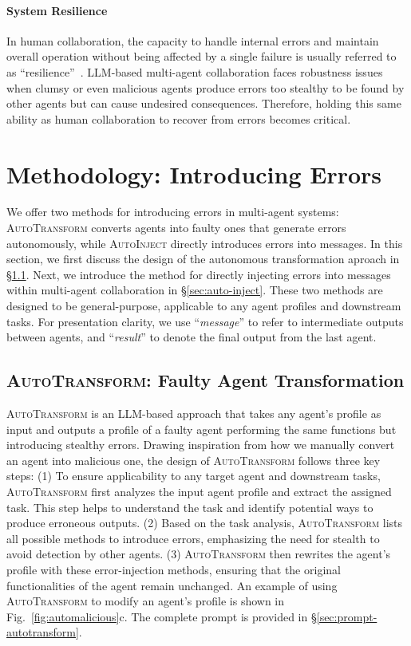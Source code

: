 \documentclass{article}
\theoremstyle{plain}
\theoremstyle{definition}
\theoremstyle{remark}
\begin{document}
\paragraph{System Resilience}
In human collaboration, the capacity to handle internal errors and maintain overall operation without being affected by a single failure is usually referred to as ``resilience''~\cite{alliger2015team, boin2013resilient, hartwig2020workplace}.
LLM-based multi-agent collaboration faces robustness issues when clumsy or even malicious agents produce errors too stealthy to be found by other agents but can cause undesired consequences.
Therefore, holding this same ability as human collaboration to recover from errors becomes critical.
\section{Methodology: Introducing Errors}

We offer two methods for introducing errors in multi-agent systems: \textsc{AutoTransform} converts agents into faulty ones that generate errors autonomously, while \textsc{AutoInject} directly introduces errors into messages.
In this section, we first discuss the design of the autonomous transformation aproach in \S\ref{sec:auto-transform}.
Next, we introduce the method for directly injecting errors into messages within multi-agent collaboration in \S\ref{sec:auto-inject}.
These two methods are designed to be general-purpose, applicable to any agent profiles and downstream tasks.
For presentation clarity, we use ``\textit{message}'' to refer to intermediate outputs between agents, and ``\textit{result}'' to denote the final output from the last agent.

\subsection{\textsc{AutoTransform}: Faulty Agent Transformation}
\label{sec:auto-transform}

\textsc{AutoTransform} is an LLM-based approach that takes any agent's profile as input and outputs a profile of a faulty agent performing the same functions but introducing stealthy errors.
Drawing inspiration from how we manually convert an agent into malicious one, the design of \textsc{AutoTransform} follows three key steps:
(1) To ensure applicability to any target agent and downstream tasks, \textsc{AutoTransform} first analyzes the input agent profile and extract the assigned task.
This step helps to understand the task and identify potential ways to produce erroneous outputs.
(2) Based on the task analysis, \textsc{AutoTransform} lists all possible methods to introduce errors, emphasizing the need for stealth to avoid detection by other agents.
(3) \textsc{AutoTransform} then rewrites the agent's profile with these error-injection methods, ensuring that the original functionalities of the agent remain unchanged.
An example of using \textsc{AutoTransform} to modify an agent's profile is shown in Fig.~\ref{fig:automalicious}c.
The complete prompt is provided in \S\ref{sec:prompt-autotransform}.
\end{document}
